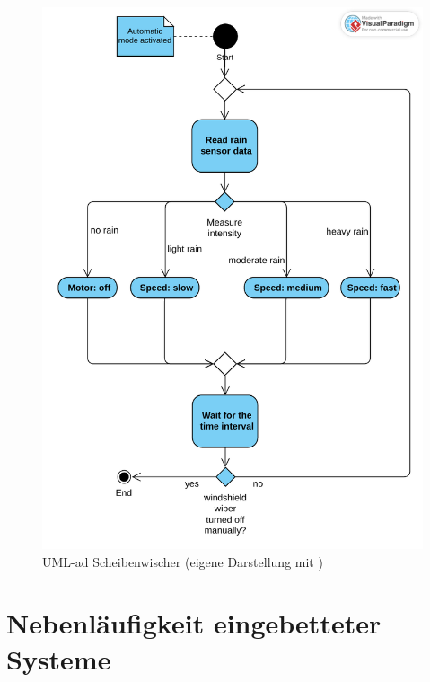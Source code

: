 \documentclass[
%
ngerman %
%
numeric %
]{wbh-assignment}
\begin{document}
\begin{figure}[htb!]
	\centering
	\includegraphics[width=1\linewidth]{Images/activity_diagramm.pdf}
	\caption[UML-\ac{ad} Scheibenwischer (eigene Darstellung mit \cite{VisualParadigmOnlineProduktivitatssuite})]{UML-\ac{ad} Scheibenwischer (eigene Darstellung mit \cite{VisualParadigmOnlineProduktivitatssuite})}
	\label{fig:activity_diagram}
\end{figure}

\clearpage

\section{Nebenläufigkeit eingebetteter Systeme}
\end{document}
